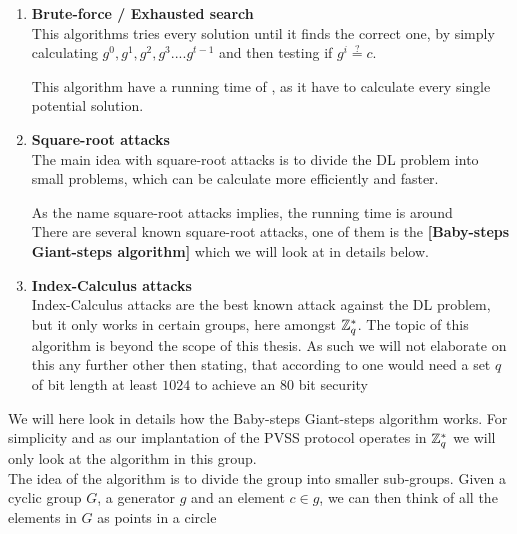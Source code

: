 \begin{enumerate}
    \item \textbf{Brute-force / Exhausted search} \\
    This algorithms tries every solution until it finds the correct one, by simply calculating
    $g^0, g^1, g^2, g^3....g^{t-1}$ and then testing if $g^i \stackrel{?}{=} c$.   
    
    \noindent
    This algorithm have a running time of , as it have to calculate
    every single potential solution. 
    
    \item \textbf{Square-root attacks} \\
    The main idea with square-root attacks is to divide the DL problem into small problems, which can be calculate more efficiently and faster. 
    
    \noindent
    As the name square-root attacks implies, the running time is around  \\

    \noindent
    There are several known square-root attacks, one of them is the \textbf{[Baby-steps Giant-steps algorithm]} which we will look at in details below. \\          
    
    \item \textbf{Index-Calculus attacks} \\
    Index-Calculus attacks are the best known attack against the DL problem, but it only
    works in certain groups, here amongst $\mathbb{Z}_q^*$. The topic of this algorithm is beyond the
    scope of this thesis. As such we will not elaborate on this any further other then stating, that according to \cite{Paar} one would need a set $q$ of bit length at least $1024$ to achieve
    an $80$ bit security
\end{enumerate}


We will here look in details how the Baby-steps Giant-steps algorithm works. For simplicity and as our implantation of the PVSS protocol operates in $\mathbb{Z}_q^*$ we will only look at the algorithm in this group. \\

\noindent
The idea of the algorithm is to divide the group into smaller sub-groups. Given a cyclic group $G$, a generator $g$ and an element $c \in g$, we can then think of all the elements in $G$ as points in a circle 

